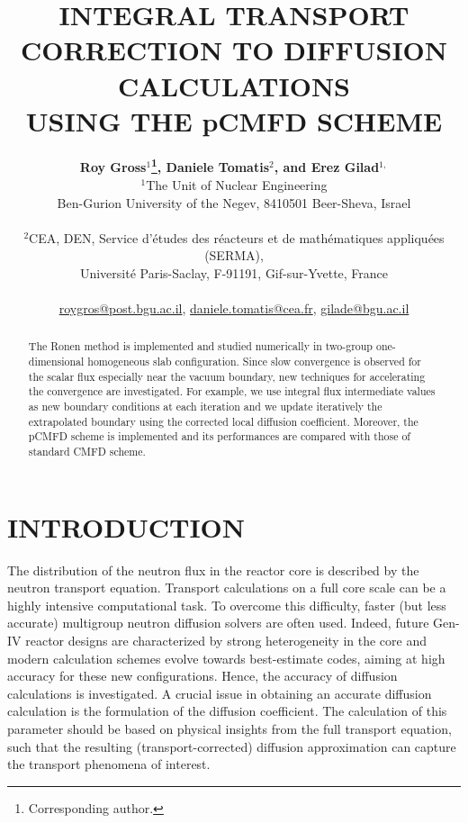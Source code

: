 \documentclass[letterpaper]{physor2020}
\title{INTEGRAL TRANSPORT CORRECTION TO DIFFUSION CALCULATIONS\\
       USING THE pCMFD SCHEME}
\author{%
  \textbf{Roy Gross$^1$\footnote{Corresponding author.},
          Daniele Tomatis$^2$, and Erez Gilad$^{1,}$} \\
  $^1$The Unit of Nuclear Engineering \\
  Ben-Gurion University of the Negev, 8410501 Beer-Sheva, Israel \\
\\
  $^2$CEA, DEN, Service d’\'etudes des r\'eacteurs et
      de math\'ematiques appliqu\'ees (SERMA), \\
    Universit\'e Paris-Saclay, F-91191, Gif-sur-Yvette, France \\
\\
  \url{roygros@post.bgu.ac.il},
  \url{daniele.tomatis@cea.fr},
  \url{gilade@bgu.ac.il}
}
\begin{document}
\maketitle
\justify

\begin{abstract}
  The Ronen method is implemented and studied numerically in two-group one-dimensional homogeneous slab configuration. Since slow convergence is observed for the scalar flux especially near the vacuum boundary, new techniques for accelerating the convergence are investigated. For example, we use integral flux intermediate values as new boundary conditions at each iteration and we update iteratively the extrapolated boundary using the corrected local diffusion coefficient. Moreover, the pCMFD scheme is implemented and its performances are compared with those of standard CMFD scheme.
\end{abstract}

\section{INTRODUCTION}
\label{sec:intro}

The distribution of the neutron flux in the reactor core is described by the neutron transport equation. Transport calculations on a full core scale can be a highly intensive computational task. To overcome this difficulty, faster (but less accurate) multigroup neutron diffusion solvers are often used. Indeed, future Gen-IV reactor designs are characterized by strong heterogeneity in the core and modern calculation schemes evolve towards best-estimate codes, aiming at high accuracy for these new configurations. Hence, the accuracy of diffusion calculations is investigated. A crucial issue in obtaining an accurate diffusion calculation is the formulation of the diffusion coefficient. The calculation of this parameter should be based on physical insights from the full transport equation, such that the resulting (transport-corrected) diffusion approximation can capture the transport phenomena of interest.
\end{document}
